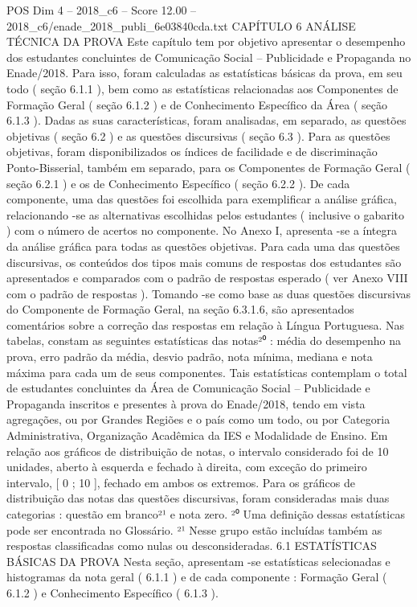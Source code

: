 \begin{textsample}{POS Dim 4 – 2018\_c6 – Score 12.00 – 2018\_c6/enade\_2018\_publi\_6e03840cda.txt}  \label{ex:f4_pos_012}
CAPÍTULO 6 ANÁLISE TÉCNICA DA PROVA Este capítulo tem por objetivo apresentar o desempenho dos estudantes concluintes de Comunicação Social – Publicidade e Propaganda no Enade/2018.
Para isso, foram calculadas as estatísticas básicas da prova, em seu todo ( seção 6.1.1 ), bem como as estatísticas relacionadas aos Componentes de Formação Geral ( seção 6.1.2 ) e de Conhecimento Específico da Área ( seção 6.1.3 ).
Dadas as suas características, foram analisadas, em separado, as questões objetivas ( seção 6.2 ) e as questões discursivas ( seção 6.3 ).
Para as questões objetivas, foram disponibilizados os índices de facilidade e de discriminação Ponto-Bisserial, também em separado, para os Componentes de Formação Geral ( seção 6.2.1 ) e os de Conhecimento Específico ( seção 6.2.2 ).
De cada componente, uma das questões foi escolhida para exemplificar a análise gráfica, relacionando -se as alternativas escolhidas pelos estudantes ( inclusive o gabarito ) com o número de acertos no componente.
No Anexo I, apresenta -se a íntegra da análise gráfica para todas as questões objetivas.
Para cada uma das questões discursivas, os conteúdos dos tipos mais comuns de respostas dos estudantes são apresentados e comparados com o padrão de respostas esperado ( ver Anexo VIII com o padrão de respostas ).
Tomando -se como base as duas questões discursivas do Componente de Formação Geral, na seção 6.3.1.6, são apresentados comentários sobre a correção das respostas em relação à Língua Portuguesa.
Nas tabelas, constam as seguintes estatísticas das notas²⁰ : média do desempenho na prova, erro padrão da média, desvio padrão, nota mínima, mediana e nota máxima para cada um de seus componentes.
Tais estatísticas contemplam o total de estudantes concluintes da Área de Comunicação Social – Publicidade e Propaganda inscritos e presentes à prova do Enade/2018, tendo em vista agregações, ou por Grandes Regiões e o país como um todo, ou por Categoria Administrativa, Organização Acadêmica da IES e Modalidade de Ensino.
Em relação aos gráficos de distribuição de notas, o intervalo considerado foi de 10 unidades, aberto à esquerda e fechado à direita, com exceção do primeiro intervalo, [ 0 ; 10 ], fechado em ambos os extremos.
Para os gráficos de distribuição das notas das questões discursivas, foram consideradas mais duas categorias : questão em branco²¹ e nota zero. ²⁰ Uma definição dessas estatísticas pode ser encontrada no Glossário. ²¹ Nesse grupo estão incluídas também as respostas classificadas como nulas ou desconsideradas. 6.1 ESTATÍSTICAS BÁSICAS DA PROVA Nesta seção, apresentam -se estatísticas selecionadas e histogramas da nota geral ( 6.1.1 ) e de cada componente : Formação Geral ( 6.1.2 ) e Conhecimento Específico ( 6.1.3 ).

\end{textsample}
